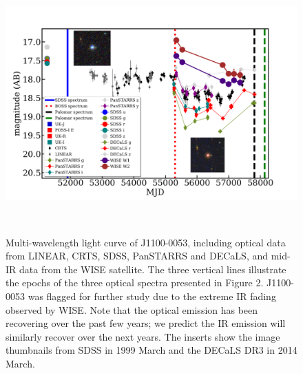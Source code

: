\documentclass{nature}
\begin{document}
\begin{figure}
  \centering
  \includegraphics[width=16.00cm, height=10.00cm, trim=0.0cm 0.0cm 0.0cm 0.0cm, clip]
  {../plots/lc/J110057_lc_20180207.png}
  \caption[]{
    Multi-wavelength light curve of J1100-0053, including optical data
    from LINEAR, CRTS, SDSS, PanSTARRS and DECaLS, and mid-IR data from
    the WISE satellite.  The three vertical lines illustrate the epochs of
    the three optical spectra presented in Figure 2.  J1100-0053 was
    flagged for further study due to the extreme IR fading observed by
    WISE.  Note that the optical emission has been recovering over the
    past few years; we predict the IR emission will similarly recover over
    the next years. The inserts show the image thumbnails from SDSS in
    1999 March and the DECaLS DR3 in 2014 March.}
  \label{fig:J110057_LC_CRTS}
\end{figure}
\end{document}
